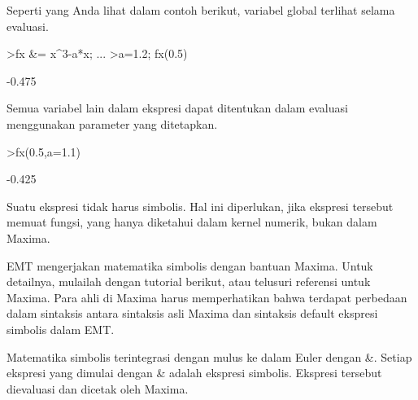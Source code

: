\documentclass[a4paper,10pt]{article}
\begin{document}
\begin{eulernotebook}
\begin{eulercomment}
\begin{eulercomment}
\begin{eulercomment}
Seperti yang Anda lihat dalam contoh berikut, variabel global terlihat
selama evaluasi.
\end{eulercomment}
\begin{eulerprompt}
>fx &= x^3-a*x;  ...
>a=1.2; fx(0.5)
\end{eulerprompt}
\begin{euleroutput}
  -0.475
\end{euleroutput}
\begin{eulercomment}
Semua variabel lain dalam ekspresi dapat ditentukan dalam evaluasi
menggunakan parameter yang ditetapkan.
\end{eulercomment}
\begin{eulerprompt}
>fx(0.5,a=1.1)
\end{eulerprompt}
\begin{euleroutput}
  -0.425
\end{euleroutput}
\begin{eulercomment}
Suatu ekspresi tidak harus simbolis. Hal ini diperlukan, jika ekspresi
tersebut memuat fungsi, yang hanya diketahui dalam kernel numerik,
bukan dalam Maxima.

\begin{eulercomment}
\begin{eulercomment}
EMT mengerjakan matematika simbolis dengan bantuan Maxima. Untuk
detailnya, mulailah dengan tutorial berikut, atau telusuri referensi
untuk Maxima. Para ahli di Maxima harus memperhatikan bahwa terdapat
perbedaan dalam sintaksis antara sintaksis asli Maxima dan sintaksis
default ekspresi simbolis dalam EMT.

Matematika simbolis terintegrasi dengan mulus ke dalam Euler dengan \&.
Setiap ekspresi yang dimulai dengan \& adalah ekspresi simbolis.
Ekspresi tersebut dievaluasi dan dicetak oleh Maxima.


\end{eulercomment}
\end{eulercomment}
\end{eulercomment}
\end{eulercomment}
\end{eulercomment}
\end{eulernotebook}
\end{document}
